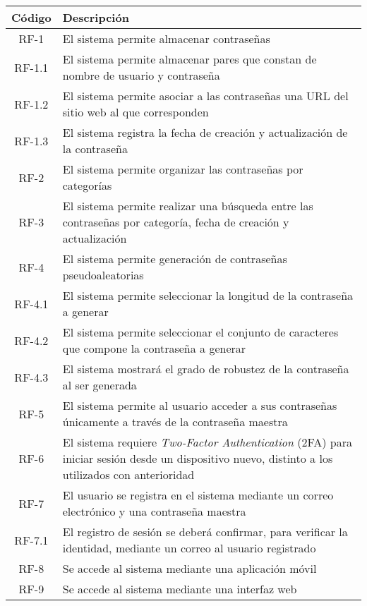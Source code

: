 \documentclass{article}
\begin{document}
\begin{table}[H]
    \centering
    \begin{tabular}{| c | p{30em} |}
    \hline
        Código &  Descripción  \\ \hline
        RF-1 & El sistema permite almacenar contraseñas \\ \hline
        RF-1.1 & El sistema permite almacenar pares que constan de nombre de usuario y contraseña  \\ \hline
        RF-1.2 & El sistema permite asociar a las contraseñas una URL del sitio web al que corresponden \\ \hline
        RF-1.3 & El sistema registra la fecha de creación y actualización de la contraseña \\ \hline
        RF-2 & El  sistema permite organizar las contraseñas por categorías \\ \hline
        RF-3 & El sistema permite realizar una búsqueda entre las contraseñas por categoría, fecha de creación y actualización  \\ \hline
        RF-4 & El sistema permite generación de contraseñas pseudoaleatorias \\ \hline
        RF-4.1 & El sistema permite seleccionar la longitud de la contraseña a generar\\ \hline
        RF-4.2 & El sistema permite seleccionar el conjunto de caracteres que compone la contraseña a generar\\ \hline
        RF-4.3 & El sistema mostrará el grado de robustez de la contraseña al ser generada \\ \hline
        RF-5 & El sistema permite al usuario acceder a sus contraseñas únicamente a través de la contraseña maestra \\ \hline
        RF-6 & El sistema requiere \textit{Two-Factor Authentication} (2FA) para iniciar sesión desde un dispositivo nuevo, distinto a los utilizados con anterioridad \\ \hline
        RF-7 & El usuario se registra en el sistema mediante un correo electrónico y una contraseña maestra\\ \hline
        RF-7.1 & El registro de sesión se deberá confirmar, para verificar la identidad, mediante un correo al usuario registrado \\ \hline
        RF-8 & Se accede al sistema mediante una aplicación móvil \\ \hline
        RF-9 & Se accede al sistema mediante una interfaz web \\ \hline
    \end{tabular}
\end{table}
\end{document}
